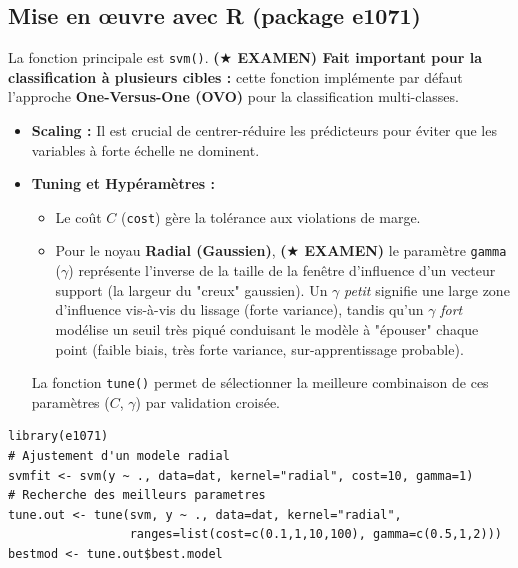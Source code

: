 \subsection{Mise en œuvre avec R (package e1071)}
La fonction principale est \texttt{svm()}. \textbf{($\bigstar$ EXAMEN) Fait important pour la classification à plusieurs cibles :} cette fonction implémente par défaut l'approche \textbf{One-Versus-One (OVO)} pour la classification multi-classes.
\begin{itemize}
    \item \textbf{Scaling :} Il est crucial de centrer-réduire les prédicteurs pour éviter que les variables à forte échelle ne dominent.
    \item \textbf{Tuning et Hypéramètres :} 
    \begin{itemize}
        \item Le coût $C$ (\texttt{cost}) gère la tolérance aux violations de marge.
        \item Pour le noyau \textbf{Radial (Gaussien)}, \textbf{($\bigstar$ EXAMEN)} le paramètre \texttt{gamma} ($\gamma$) représente l'inverse de la taille de la fenêtre d'influence d'un vecteur support (la largeur du "creux" gaussien). Un $\gamma$ \textit{petit} signifie une large zone d'influence vis-à-vis du lissage (forte variance), tandis qu'un $\gamma$ \textit{fort} modélise un seuil très piqué conduisant le modèle à "épouser" chaque point (faible biais, très forte variance, sur-apprentissage probable).
    \end{itemize}
    La fonction \texttt{tune()} permet de sélectionner la meilleure combinaison de ces paramètres ($C$, $\gamma$) par validation croisée.
\end{itemize}

\begin{lstlisting}[caption=Exemple d'utilisation de e1071]
library(e1071)
# Ajustement d'un modele radial
svmfit <- svm(y ~ ., data=dat, kernel="radial", cost=10, gamma=1)
# Recherche des meilleurs parametres
tune.out <- tune(svm, y ~ ., data=dat, kernel="radial", 
                 ranges=list(cost=c(0.1,1,10,100), gamma=c(0.5,1,2)))
bestmod <- tune.out$best.model
\end{lstlisting}
